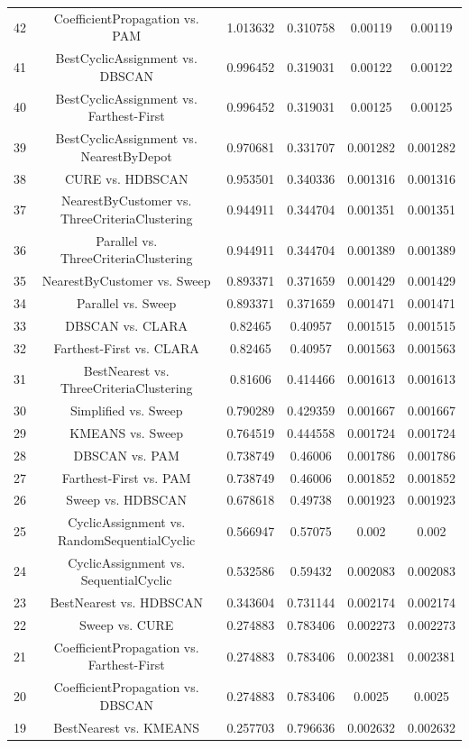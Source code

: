 \documentclass[a4paper,10pt]{article}
\begin{document}
\begin{landscape}
\begin{table}[!htp]
\begin{tabular}{cccccc}
42&CoefficientPropagation vs. PAM&1.013632&0.310758&0.00119&0.00119\\
41&BestCyclicAssignment vs. DBSCAN&0.996452&0.319031&0.00122&0.00122\\
40&BestCyclicAssignment vs. Farthest-First&0.996452&0.319031&0.00125&0.00125\\
39&BestCyclicAssignment vs. NearestByDepot&0.970681&0.331707&0.001282&0.001282\\
38&CURE vs. HDBSCAN&0.953501&0.340336&0.001316&0.001316\\
37&NearestByCustomer vs. ThreeCriteriaClustering&0.944911&0.344704&0.001351&0.001351\\
36&Parallel vs. ThreeCriteriaClustering&0.944911&0.344704&0.001389&0.001389\\
35&NearestByCustomer vs. Sweep&0.893371&0.371659&0.001429&0.001429\\
34&Parallel vs. Sweep&0.893371&0.371659&0.001471&0.001471\\
33&DBSCAN vs. CLARA&0.82465&0.40957&0.001515&0.001515\\
32&Farthest-First vs. CLARA&0.82465&0.40957&0.001563&0.001563\\
31&BestNearest vs. ThreeCriteriaClustering&0.81606&0.414466&0.001613&0.001613\\
30&Simplified vs. Sweep&0.790289&0.429359&0.001667&0.001667\\
29&KMEANS vs. Sweep&0.764519&0.444558&0.001724&0.001724\\
28&DBSCAN vs. PAM&0.738749&0.46006&0.001786&0.001786\\
27&Farthest-First vs. PAM&0.738749&0.46006&0.001852&0.001852\\
26&Sweep vs. HDBSCAN&0.678618&0.49738&0.001923&0.001923\\
25&CyclicAssignment vs. RandomSequentialCyclic&0.566947&0.57075&0.002&0.002\\
24&CyclicAssignment vs. SequentialCyclic&0.532586&0.59432&0.002083&0.002083\\
23&BestNearest vs. HDBSCAN&0.343604&0.731144&0.002174&0.002174\\
22&Sweep vs. CURE&0.274883&0.783406&0.002273&0.002273\\
21&CoefficientPropagation vs. Farthest-First&0.274883&0.783406&0.002381&0.002381\\
20&CoefficientPropagation vs. DBSCAN&0.274883&0.783406&0.0025&0.0025\\
19&BestNearest vs. KMEANS&0.257703&0.796636&0.002632&0.002632\\

\end{tabular}
\end{table}
\end{landscape}
\end{document}

